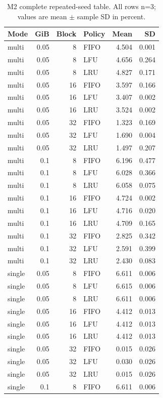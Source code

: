 \documentclass{article}
\begin{document}
\begin{table}[t]\centering\small\caption{M2 complete repeated-seed table. All rows n=3; values are mean $\pm$ sample SD in percent.}
\begin{tabular}{lrrlrr}\toprule Mode & GiB & Block & Policy & Mean & SD\\\midrule
multi & 0.05 & 8 & FIFO & 4.504 & 0.001\\
multi & 0.05 & 8 & LFU & 4.656 & 0.264\\
multi & 0.05 & 8 & LRU & 4.827 & 0.171\\
multi & 0.05 & 16 & FIFO & 3.597 & 0.166\\
multi & 0.05 & 16 & LFU & 3.407 & 0.002\\
multi & 0.05 & 16 & LRU & 3.524 & 0.002\\
multi & 0.05 & 32 & FIFO & 1.323 & 0.169\\
multi & 0.05 & 32 & LFU & 1.690 & 0.004\\
multi & 0.05 & 32 & LRU & 1.497 & 0.207\\
multi & 0.1 & 8 & FIFO & 6.196 & 0.477\\
multi & 0.1 & 8 & LFU & 6.028 & 0.366\\
multi & 0.1 & 8 & LRU & 6.058 & 0.075\\
multi & 0.1 & 16 & FIFO & 4.724 & 0.002\\
multi & 0.1 & 16 & LFU & 4.716 & 0.020\\
multi & 0.1 & 16 & LRU & 4.709 & 0.165\\
multi & 0.1 & 32 & FIFO & 2.825 & 0.342\\
multi & 0.1 & 32 & LFU & 2.591 & 0.399\\
multi & 0.1 & 32 & LRU & 2.430 & 0.083\\
single & 0.05 & 8 & FIFO & 6.611 & 0.006\\
single & 0.05 & 8 & LFU & 6.615 & 0.006\\
single & 0.05 & 8 & LRU & 6.611 & 0.006\\
single & 0.05 & 16 & FIFO & 4.412 & 0.013\\
single & 0.05 & 16 & LFU & 4.412 & 0.013\\
single & 0.05 & 16 & LRU & 4.412 & 0.013\\
single & 0.05 & 32 & FIFO & 0.015 & 0.026\\
single & 0.05 & 32 & LFU & 0.030 & 0.026\\
single & 0.05 & 32 & LRU & 0.015 & 0.026\\
single & 0.1 & 8 & FIFO & 6.611 & 0.006\\

\end{tabular}
\end{table}
\end{document}
